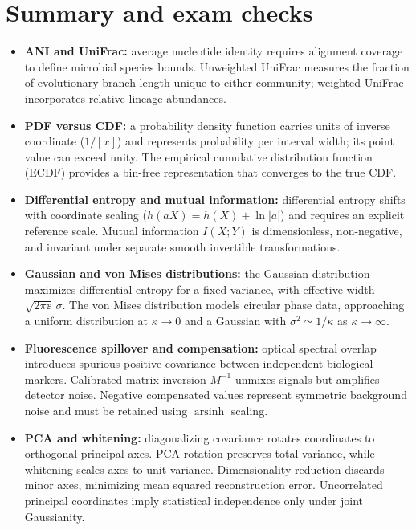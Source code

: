 \section*{Summary and exam checks}
\begin{itemize}
\item \textbf{ANI and UniFrac:} average nucleotide identity requires alignment coverage to define microbial species bounds. Unweighted UniFrac measures the fraction of evolutionary branch length unique to either community; weighted UniFrac incorporates relative lineage abundances.
\item \textbf{PDF versus CDF:} a probability density function carries units of inverse coordinate ($1/[x]$) and represents probability per interval width; its point value can exceed unity. The empirical cumulative distribution function (ECDF) provides a bin-free representation that converges to the true CDF.
\item \textbf{Differential entropy and mutual information:} differential entropy shifts with coordinate scaling ($h(aX)=h(X)+\ln|a|$) and requires an explicit reference scale. Mutual information $I(X;Y)$ is dimensionless, non-negative, and invariant under separate smooth invertible transformations.
\item \textbf{Gaussian and von Mises distributions:} the Gaussian distribution maximizes differential entropy for a fixed variance, with effective width $\sqrt{2\pi\ee}\,\sigma$. The von Mises distribution models circular phase data, approaching a uniform distribution at $\kappa \to 0$ and a Gaussian with $\sigma^2 \simeq 1/\kappa$ as $\kappa \to \infty$.
\item \textbf{Fluorescence spillover and compensation:} optical spectral overlap introduces spurious positive covariance between independent biological markers. Calibrated matrix inversion $M^{-1}$ unmixes signals but amplifies detector noise. Negative compensated values represent symmetric background noise and must be retained using $\operatorname{arsinh}$ scaling.
\item \textbf{PCA and whitening:} diagonalizing covariance rotates coordinates to orthogonal principal axes. PCA rotation preserves total variance, while whitening scales axes to unit variance. Dimensionality reduction discards minor axes, minimizing mean squared reconstruction error. Uncorrelated principal coordinates imply statistical independence only under joint Gaussianity.
\end{itemize}

